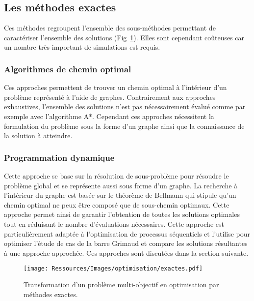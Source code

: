 \subsection{Les méthodes exactes} %
\label{sub:les_methodes_exactes}
Ces méthodes regroupent l’ensemble des sous-méthodes permettant de caractériser
l’ensemble des solutions (Fig~\ref{fig:multi_exactes}). Elles sont cependant
coûteuses car un nombre très important de simulations est requis.


\subsubsection{Algorithmes de chemin optimal} %
\label{ssub:algorithmes_de_chemin_optimal}
Ces approches permettent de trouver un chemin optimal à l’intérieur d’un problème
représenté à l’aide de graphes. Contrairement aux approches exhaustives, l’ensemble
des solutions n’est pas nécessairement évalué comme par exemple avec l’algorithme
A*. Cependant ces approches nécessitent la formulation du problème sous la forme d’un
graphe ainsi que la connaissance de la solution à atteindre.


\subsubsection{Programmation dynamique} %
\label{ssub:programmation_dynamique}
Cette approche se base sur la résolution de sous-problème pour résoudre le problème global
et se représente aussi sous forme d’un graphe. La recherche à l’intérieur du graphe est basée
sur le théorème de Bellmann qui stipule qu’un chemin optimal ne peux être composé
que de sous-chemin optimaux. Cette approche permet ainsi de garantir l’obtention
de toutes les solutions optimales tout en réduisant le nombre d’évaluations nécessaires.
Cette approche est particulièrement adaptée à l’optimisation de processus séquentiels
et \cite{Rivallain2013} l’utilise pour optimiser l’étude de cas de la barre Grimaud
et compare les solutions résultantes à une approche approchée. Ces approches sont
discutées dans la section suivante.

\begin{figure}
    \begin{center}
        \texttt{[image: Ressources/Images/optimisation/exactes.pdf]}
    \end{center}
    \caption{Transformation d’un problème multi-objectif en optimisation par méthodes
             exactes.
             \label{fig:multi_exactes}}
\end{figure}



